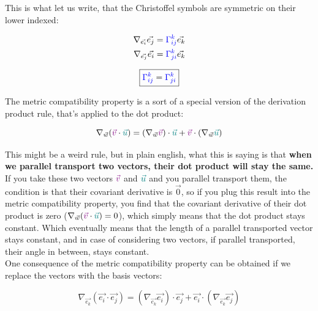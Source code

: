 This is what let us write, that the Christoffel symbols are symmetric on their lower indexed:

\begin{align*}
    \nabla_{\vec{e_i}}\vec{e_j} &= \begingroup\color{blue}\Gamma^k_{ij}\endgroup\vec{e_k}\\
    \nabla_{\vec{e_j}}\vec{e_i} &= \begingroup\color{blue}\Gamma^k_{ji}\endgroup\vec{e_k}
\end{align*}

\begin{equation}
    \boxed{\begingroup\color{blue}\Gamma^k_{ij}\endgroup = \begingroup\color{blue}\Gamma^k_{ji}\endgroup}
\end{equation}

The metric compatibility property is a sort of a special version of the derivation product rule, that's applied 
to the dot product:

\begin{equation}
    \nabla_{\vec{w}}(\begingroup\color{violet}\vec{v}\endgroup \cdot \begingroup\color{teal}\vec{u}\endgroup) = (\nabla_{\vec{w}}\begingroup\color{violet}\vec{v}\endgroup) \cdot \begingroup\color{teal}\vec{u}\endgroup + \begingroup\color{violet}\vec{v}\endgroup \cdot (\nabla_{\vec{w}}\begingroup\color{teal}\vec{u}\endgroup)
\end{equation}

This might be a weird rule, but in plain english, what this is saying is that \textbf{when we parallel transport two vectors, their dot product will stay the same.}\\

If you take these two vectors $\color{violet}\vec{v}$ and $\color{teal}\vec{u}$ and you parallel transport them, the condition is that their covariant derivative is $\vec{0}$, so if you plug
this result into the metric compatibility property, you find that the covariant derivative of their dot product is zero ($\nabla_{\vec{w}}(\begingroup\color{violet}\vec{v}\endgroup \cdot \begingroup\color{teal}\vec{u}\endgroup) = 0$), 
which simply means that the dot product stays constant. Which eventually means that the length of a parallel transported vector stays constant, and in case of considering two vectors, if parallel transported, their 
angle in between, stays constant.\\

One consequence of the metric compatibility property can be obtained if we replace the vectors with the basis vectors:

\begin{equation}
       \nabla_{\vec{e_k}}(\vec{e_i} \cdot \vec{e_j}) = (\nabla_{\vec{e_k}}\vec{e_i}) \cdot \vec{e_j} + \vec{e_i} \cdot (\nabla_{\vec{e_k}}\vec{e_j}) 
\end{equation}

